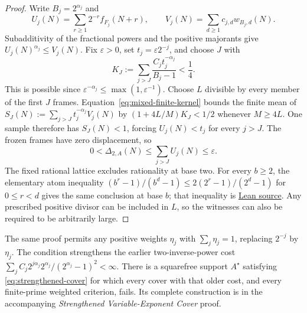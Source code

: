 \documentclass[11pt]{article}
\begin{document}
\begin{proof}
Write $B_j=2^{\alpha_j}$ and
\[
 U_j(N)=\sum_{r\ge1}2^{-r}f_{F_j}(N+r),\qquad
 V_j(N)=\sum_{d\ge1}c_{j,d}w_{B_j,d}(N).
\]
Subadditivity of the fractional powers and the positive majorants give
$U_j(N)^{\alpha_j}\le V_j(N)$.
Fix $\varepsilon>0$, set $t_j=\varepsilon2^{-j}$, and choose $J$ with
\[
 K_J:=\sum_{j>J}\frac{C_jt_j^{-\alpha_j}}{B_j-1}<\frac14.
\]
This is possible since $\varepsilon^{-\alpha_j}\le\max(1,\varepsilon^{-1})$.
Choose $L$ divisible by every member of the first $J$ frames.  Equation~\eqref{eq:mixed-finite-kernel} bounds the finite mean of
$S_J(N):=\sum_{j>J}t_j^{-\alpha_j}V_j(N)$ by
$(1+4L/M)K_J<1/2$ whenever $M\ge4L$.
One sample therefore has $S_J(N)<1$, forcing $U_j(N)<t_j$ for every $j>J$.
The frozen frames have zero displacement, so
\[
 0<\Delta_{2,A}(N)\le\sum_{j>J}U_j(N)\le\varepsilon.
\]
The fixed rational lattice excludes rationality at base two.
For every $b\ge2$, the elementary atom inequality
$(b^r-1)/(b^d-1)\le2(2^r-1)/(2^d-1)$ for $0\le r<d$
gives the same conclusion at base $b$; that inequality is
\href{https://github.com/wcook04/plectis-erdos/blob/f36a98bf3d3e6f65f1074e3b800e3293d5b8a51a/ErdosProblems/Erdos257/PaperCompleteR7/CoverKernel.lean#L232}{Lean source}.
Any prescribed positive divisor can be included in $L$, so the witnesses
can also be required to be arbitrarily large.
\end{proof}

The same proof permits any positive weights $\eta_j$ with $\sum_j\eta_j=1$,
replacing $2^{-j}$ by $\eta_j$.
The condition strengthens the earlier two-inverse-power cost
$\sum_jC_j2^{j\alpha_j}2^{\alpha_j}/(2^{\alpha_j}-1)^2<\infty$.
There is a squarefree support $A^\star$ satisfying
\eqref{eq:strengthened-cover} for which every cover with that older cost,
and every finite-prime weighted criterion, fails.  Its complete construction
is in the accompanying \emph{Strengthened Variable-Exponent Cover} proof.
\end{document}
